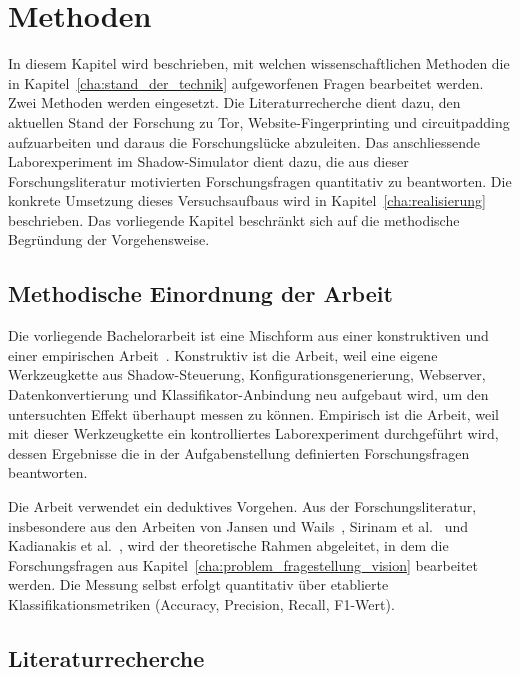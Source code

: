 \chapter{Methoden}
\label{cha:methoden}

In diesem Kapitel wird beschrieben, mit welchen wissenschaftlichen Methoden die in Kapitel~\ref{cha:stand_der_technik} aufgeworfenen Fragen bearbeitet werden.
Zwei Methoden werden eingesetzt.
Die Literaturrecherche dient dazu, den aktuellen Stand der Forschung zu Tor, Website-Fingerprinting und \gls{circuitpadding} aufzuarbeiten und daraus die Forschungslücke abzuleiten.
Das anschliessende Laborexperiment im Shadow-Simulator dient dazu, die aus dieser Forschungsliteratur motivierten Forschungsfragen quantitativ zu beantworten.
Die konkrete Umsetzung dieses Versuchsaufbaus wird in Kapitel~\ref{cha:realisierung} beschrieben.
Das vorliegende Kapitel beschränkt sich auf die methodische Begründung der Vorgehensweise.

\section{Methodische Einordnung der Arbeit}
\label{sec:methodische_einordnung}

Die vorliegende Bachelorarbeit ist eine Mischform aus einer konstruktiven und einer empirischen Arbeit~\cite{book}.
Konstruktiv ist die Arbeit, weil eine eigene Werkzeugkette aus Shadow-Steuerung, Konfigurationsgenerierung, Webserver, Datenkonvertierung und Klassifikator-Anbindung neu aufgebaut wird, um den untersuchten Effekt überhaupt messen zu können.
Empirisch ist die Arbeit, weil mit dieser Werkzeugkette ein kontrolliertes Laborexperiment durchgeführt wird, dessen Ergebnisse die in der Aufgabenstellung definierten Forschungsfragen beantworten.

Die Arbeit verwendet ein deduktives Vorgehen.
Aus der Forschungsliteratur, insbesondere aus den Arbeiten von Jansen und Wails~\cite{jansen2023data}, Sirinam et al.~\cite{sirinam2018deep} und Kadianakis et al.~\cite{kadianakis2021tor}, wird der theoretische Rahmen abgeleitet, in dem die Forschungsfragen aus Kapitel~\ref{cha:problem_fragestellung_vision} bearbeitet werden.
Die Messung selbst erfolgt quantitativ über etablierte Klassifikationsmetriken (Accuracy, Precision, Recall, F1-Wert).

\section{Literaturrecherche}
\label{sec:literaturrecherche}

